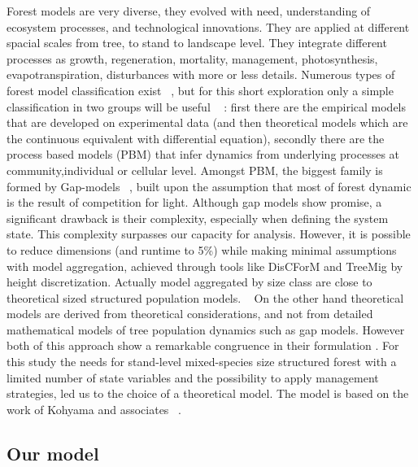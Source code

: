 \documentclass{article}
\begin{document}
Forest models are very diverse, they evolved with need, understanding of ecosystem processes, and technological innovations. They are applied at different spacial scales from tree, to stand to landscape level. They integrate different processes as growth, regeneration, mortality, management, photosynthesis, evapotranspiration, disturbances with more or less details. Numerous types of forest model classification exist ~\autocite{porteModellingMixedForest2002}, but for this short exploration only a simple classification in two groups will be useful ~\autocite{fontesModelsSupportingForest2011} : first there are the empirical models that are developed on experimental data (and then theoretical models which are the continuous equivalent with differential equation), secondly there are the process based models (PBM) that infer dynamics from underlying processes at community,individual or cellular level. Amongst PBM, the biggest family is formed by Gap-models ~\autocite{bugmannREVIEWFORESTGAP2001}, built upon the assumption that most of forest dynamic is the result of competition for light.
Although gap models show promise, a significant drawback is their complexity, especially when defining the system state. This complexity surpasses our capacity for analysis. However, it is possible to reduce dimensions (and runtime to 5\%) while making minimal assumptions with model aggregation, achieved through tools like DisCForM and TreeMig \autocite{lischkeAggregationIndividualTrees1998,lischkeTreeMigForestlandscapeModel2006} by height discretization.
Actually model aggregated by size class are close to theoretical sized structured population models. ~\autocite{bugmannREVIEWFORESTGAP2001}
On the other hand theoretical models are derived from theoretical considerations, and not from detailed mathematical models of tree population dynamics such as gap models. However both of this approach show a remarkable congruence in their formulation \autocite{bugmannREVIEWFORESTGAP2001}.
For this study the needs for stand-level mixed-species size structured forest with a limited number of state variables and the possibility to apply management strategies, led us to the choice of a theoretical model. The model is based on the work of Kohyama and associates ~\autocite{kohyamaStratificationTheoryPlant2009, kohyamaOnesidedCompetitionLight2012}.

\subsection{Our model}
\end{document}
